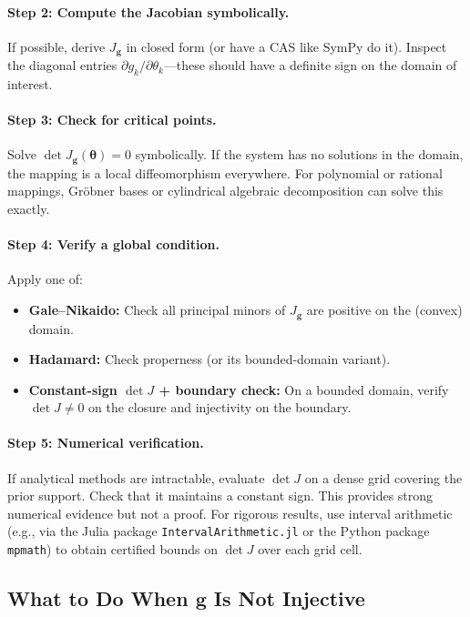 \documentclass[11pt,a4paper]{article}
\theoremstyle{definition}
\newcommand{\btheta}{\boldsymbol{\theta}}
\begin{document}
\paragraph{Step 2: Compute the Jacobian symbolically.} If possible, derive
$J_{\mathbf{g}}$ in closed form (or have a CAS like SymPy do it). Inspect
the diagonal entries $\partial g_k / \partial \theta_k$---these should have
a definite sign on the domain of interest.

\paragraph{Step 3: Check for critical points.} Solve $\det J_{\mathbf{g}}
(\btheta) = 0$ symbolically. If the system has no solutions in the domain, the
mapping is a local diffeomorphism everywhere. For polynomial or rational
mappings, Gr\"obner bases or cylindrical algebraic decomposition can solve this
exactly.

\paragraph{Step 4: Verify a global condition.} Apply one of:
\begin{itemize}
    \item \textbf{Gale--Nikaido:} Check all principal minors of $J_{\mathbf{g}}$
    are positive on the (convex) domain.
    \item \textbf{Hadamard:} Check properness (or its bounded-domain variant).
    \item \textbf{Constant-sign $\det J$ + boundary check:} On a bounded
    domain, verify $\det J \neq 0$ on the closure and injectivity on the
    boundary.
\end{itemize}

\paragraph{Step 5: Numerical verification.} If analytical methods are
intractable, evaluate $\det J$ on a dense grid covering the prior support.
Check that it maintains a constant sign. This provides strong numerical
evidence but not a proof. For rigorous results, use interval arithmetic
(e.g., via the Julia package \texttt{IntervalArithmetic.jl} or the Python
package \texttt{mpmath}) to obtain certified bounds on $\det J$ over each
grid cell.


\subsection{What to Do When \texorpdfstring{$\mathbf{g}$}{g} Is Not Injective}
\end{document}
